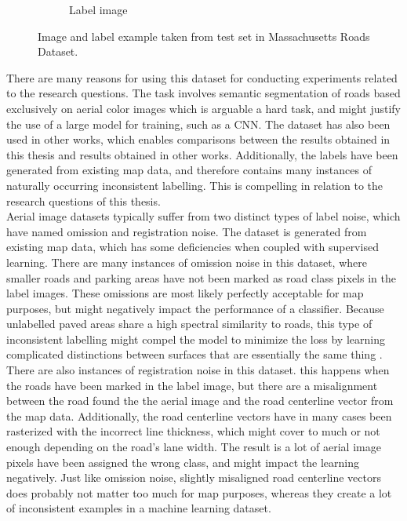 \begin{figure}
\begin{subfigure}{0.48\textwidth}
\caption{Label image} \label{fig:mass_roads_example_label}
\end{subfigure}
\hspace*{\fill} %
\caption{Image and label example taken from test set in Massachusetts Roads Dataset.} \label{fig:mass_roads_example}
\end{figure}


There are many reasons for using this dataset for conducting experiments related to the research questions.  The task involves semantic segmentation of roads based exclusively on aerial color images which is arguable a hard task, and might justify the use of a large model for training, such as a \ac{CNN}. The dataset has also been used in other works, which enables comparisons between the results obtained in this thesis and results obtained in other works. Additionally, the labels have been generated from existing map data, and therefore contains many instances of naturally occurring inconsistent labelling. This is compelling in relation to the research questions of this thesis.\\

Aerial image datasets typically suffer from two distinct types of label noise, which \cite{Mnih_aerial_images_noisy} have named omission and registration noise. The dataset is generated from existing map data, which has some deficiencies when coupled with supervised learning. There are many instances of omission noise in this dataset, where smaller roads and parking areas have not been marked as road class pixels in the label images. These omissions are most likely perfectly acceptable for map purposes, but might negatively impact the performance of a classifier.  Because unlabelled paved areas share a high spectral similarity to roads, this type of inconsistent labelling might compel the model to minimize the loss by learning complicated distinctions between surfaces that are essentially the same thing .\\

There are also instances of registration noise in this dataset. this happens when the roads have been marked in the label image, but there are a misalignment between the road found the the aerial image and the road centerline vector from the map data. Additionally, the road centerline vectors have in many cases been rasterized with the incorrect line thickness, which might cover to much or not enough depending on the road's lane width. The result is a lot of aerial image pixels have been assigned the wrong class, and might impact the learning negatively. Just like omission noise, slightly misaligned road centerline vectors does probably not matter too much for map purposes, whereas they create a lot of inconsistent examples in a machine learning dataset.


